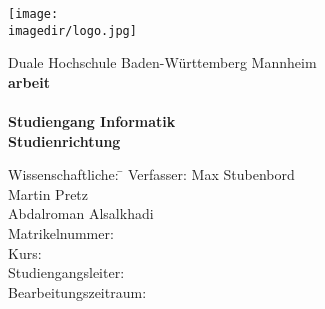\begin{titlepage}
	\begin{minipage}{\textwidth}
		\vspace{-2cm}
 \texttt{[image: \\imagedir/logo.jpg]}
	\end{minipage}
	\vspace{1em}
	\begin{center}
		{\textsf{\large Duale Hochschule Baden-W\"urttemberg Mannheim}}\\[4em]
		{\textsf{\textbf{\large{\DieArtDerArbeit}arbeit}}}\\[6mm]
		{\textsf{\textbf{\Large{}\DerTitelDerArbeit}}} \\[1.5cm]
		{\textsf{\textbf{\large{}Studiengang Informatik}}\\[6mm]
		\textsf{\textbf{Studienrichtung \DieStudienrichtung}}}\vspace{10em}

		\begin{minipage}{\textwidth}
			\begin{tabbing}
				Wissenschaftliche: \hspace{0.85cm}\=\kill
				Verfasser: \> Max Stubenbord \\ \>  Martin Pretz \\ \> Abdalroman Alsalkhadi\\[1.5mm]
				Matrikelnummer: \> \DieMatrikelnummer \\[1.5mm]
				Kurs: \> \DieKursbezeichnung \\[1.5mm]
				Studiengangsleiter: \> \DerStudiengangsleiter \\[1.5mm]
				Bearbeitungszeitraum: \> \DerBearbeitungszeitraum\\[1.5mm]
			\end{tabbing}
		\end{minipage}
	\end{center}
\end{titlepage}